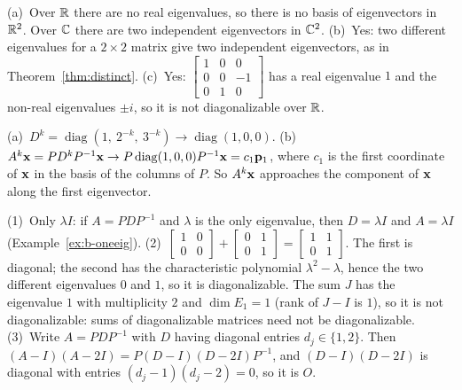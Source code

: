 \documentclass[11pt]{article}
\begin{document}
\begin{description}[leftmargin=0pt,itemsep=5pt]
  \item[Pause and think \ref{think:cplxthink}.] (a)~Over $\mathbb{R}$ there are no real eigenvalues, so there is no basis of eigenvectors in $\mathbb{R}^2$. Over $\mathbb{C}$ there are two independent eigenvectors in $\mathbb{C}^2$. (b)~Yes: two different eigenvalues for a $2\times2$ matrix give two independent eigenvectors, as in Theorem~\ref{thm:distinct}. (c)~Yes: $\begin{bmatrix}1&0&0\\0&0&-1\\0&1&0\end{bmatrix}$ has a real eigenvalue $1$ and the non-real eigenvalues $\pm i$, so it is not diagonalizable over $\mathbb{R}$.
  \item[Pause and think \ref{think:limit}.] (a)~$D^k=\operatorname{diag}(1,\ 2^{-k},\ 3^{-k})\to\operatorname{diag}(1,0,0)$. (b)~$A^k\mathbf{x}=PD^kP^{-1}\mathbf{x}\to P\operatorname{diag}(1,0,0)P^{-1}\mathbf{x}=c_1\mathbf{p}_1$, where $c_1$ is the first coordinate of $\mathbf{x}$ in the basis of the columns of $P$. So $A^k\mathbf{x}$ approaches the component of $\mathbf{x}$ along the first eigenvector.
  \item[Questions to think about.] (1)~Only $\lambda I$: if $A=PDP^{-1}$ and $\lambda$ is the only eigenvalue, then $D=\lambda I$ and $A=\lambda I$ (Example~\ref{ex:b-oneeig}). (2)~$\begin{bmatrix}1&0\\0&0\end{bmatrix}+\begin{bmatrix}0&1\\0&1\end{bmatrix}=\begin{bmatrix}1&1\\0&1\end{bmatrix}$. The first is diagonal; the second has the characteristic polynomial $\lambda^2-\lambda$, hence the two different eigenvalues $0$ and $1$, so it is diagonalizable. The sum $J$ has the eigenvalue $1$ with multiplicity $2$ and $\dim E_1=1$ (rank of $J-I$ is $1$), so it is not diagonalizable: sums of diagonalizable matrices need not be diagonalizable. (3)~Write $A=PDP^{-1}$ with $D$ having diagonal entries $d_j\in\{1,2\}$. Then $(A-I)(A-2I)=P(D-I)(D-2I)P^{-1}$, and $(D-I)(D-2I)$ is diagonal with entries $(d_j-1)(d_j-2)=0$, so it is $O$.
\end{description}
\end{document}
